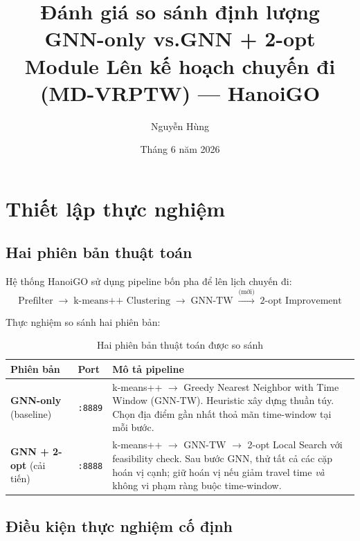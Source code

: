 \documentclass[12pt,a4paper]{article}
\begin{document}
\title{%
  \textbf{Đánh giá so sánh định lượng}\\[4pt]
  \large GNN-only \quad vs.\quad GNN + 2-opt\\[2pt]
  \normalsize Module Lên kế hoạch chuyến đi (MD-VRPTW) --- HanoiGO
}
\author{Nguyễn Hùng}
\date{Tháng 6 năm 2026}
\maketitle
\tableofcontents
\newpage

\section{Thiết lập thực nghiệm}

\subsection{Hai phiên bản thuật toán}

Hệ thống HanoiGO sử dụng pipeline bốn pha để lên lịch chuyến đi:
\[
  \text{Prefilter} \;\to\; \text{k-means++ Clustering} \;\to\; \text{GNN-TW} \;\xrightarrow{\text{(mới)}} \; \text{2-opt Improvement}
\]

Thực nghiệm so sánh hai phiên bản:

\begin{table}[H]
\centering
\begin{tabular}{llp{7.5cm}}
\toprule
\textbf{Phiên bản} & \textbf{Port} & \textbf{Mô tả pipeline} \\
\midrule
\textbf{GNN-only} (baseline) & \texttt{:8889}
  & k-means++ $\to$ Greedy Nearest Neighbor with Time Window (GNN-TW).
    Heuristic xây dựng thuần túy. Chọn địa điểm gần nhất thoả mãn time-window tại mỗi bước. \\[4pt]
\textbf{GNN + 2-opt} (cải tiến) & \texttt{:8888}
  & k-means++ $\to$ GNN-TW $\to$ 2-opt Local Search với feasibility check.
    Sau bước GNN, thử tất cả các cặp hoán vị cạnh; giữ hoán vị nếu giảm travel time \textit{và} không vi phạm ràng buộc time-window.\\
\bottomrule
\end{tabular}
\caption{Hai phiên bản thuật toán được so sánh}
\end{table}

\subsection{Điều kiện thực nghiệm cố định}
\end{document}
